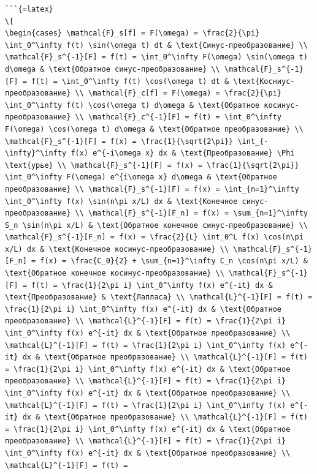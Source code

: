 \documentclass[
  ukrainian,
]{article}
\begin{document}
\begin{verbatim}
```{=latex}
\[
\begin{cases} \mathcal{F}_s[f] = F(\omega) = \frac{2}{\pi} \int_0^\infty f(t) \sin(\omega t) dt & \text{Синус-преобразование} \\ \mathcal{F}_s^{-1}[F] = f(t) = \int_0^\infty F(\omega) \sin(\omega t) d\omega & \text{Обратное синус-преобразование} \\ \mathcal{F}_s^{-1}[F] = f(t) = \int_0^\infty f(t) \cos(\omega t) dt & \text{Косниус-преобразование} \\ \mathcal{F}_c[f] = F(\omega) = \frac{2}{\pi} \int_0^\infty f(t) \cos(\omega t) d\omega & \text{Обратное косинус-преобразование} \\ \mathcal{F}_c^{-1}[F] = f(t) = \int_0^\infty F(\omega) \cos(\omega t) d\omega & \text{Обратное преобразование} \\ \mathcal{F}_s^{-1}[F] = f(x) = \frac{1}{\sqrt{2\pi}} \int_{-\infty}^\infty f(x) e^{-i\omega x} dx & \text{Преобразование} \Phi \text{урье} \\ \mathcal{F}_s^{-1}[F] = f(x) = \frac{1}{\sqrt{2\pi}} \int_0^\infty F(\omega) e^{i\omega x} d\omega & \text{Обратное преобразование} \\ \mathcal{F}_s^{-1}[F] = f(x) = \int_{n=1}^\infty \int_0^\infty f(x) \sin(n\pi x/L) dx & \text{Конечное синус-преобразование} \\ \mathcal{F}_s^{-1}[F_n] = f(x) = \sum_{n=1}^\infty S_n \sin(n\pi x/L) & \text{Обратное конечное синус-преобразование} \\ \mathcal{F}_s^{-1}[F_n] = f(x) = \frac{2}{L} \int_0^L f(x) \cos(n\pi x/L) dx & \text{Конечное косинус-преобразование} \\ \mathcal{F}_s^{-1}[F_n] = f(x) = \frac{C_0}{2} + \sum_{n=1}^\infty C_n \cos(n\pi x/L) & \text{Обратное конечное косинус-преобразование} \\ \mathcal{F}_s^{-1}[F] = f(t) = \frac{1}{2\pi i} \int_0^\infty f(x) e^{-it} dx & \text{Преобразование} & \text{Лапласа} \\ \mathcal{L}^{-1}[F] = f(t) = \frac{1}{2\pi i} \int_0^\infty f(x) e^{-it} dx & \text{Обратное преобразование} \\ \mathcal{L}^{-1}[F] = f(t) = \frac{1}{2\pi i} \int_0^\infty f(x) e^{-it} dx & \text{Обратное преобразование} \\ \mathcal{L}^{-1}[F] = f(t) = \frac{1}{2\pi i} \int_0^\infty f(x) e^{-it} dx & \text{Обратное преобразование} \\ \mathcal{L}^{-1}[F] = f(t) = \frac{1}{2\pi i} \int_0^\infty f(x) e^{-it} dx & \text{Обратное преобразование} \\ \mathcal{L}^{-1}[F] = f(t) = \frac{1}{2\pi i} \int_0^\infty f(x) e^{-it} dx & \text{Обратное преобразование} \\ \mathcal{L}^{-1}[F] = f(t) = \frac{1}{2\pi i} \int_0^\infty f(x) e^{-it} dx & \text{Обратное преобразование} \\ \mathcal{L}^{-1}[F] = f(t) = \frac{1}{2\pi i} \int_0^\infty f(x) e^{-it} dx & \text{Обратное преобразование} \\ \mathcal{L}^{-1}[F] = f(t) = \frac{1}{2\pi i} \int_0^\infty f(x) e^{-it} dx & \text{Обратное преобразование} \\ \mathcal{L}^{-1}[F] = f(t) = 
\end{verbatim}
\end{document}

